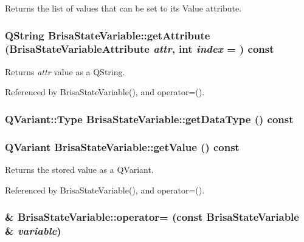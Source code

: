 Returns the list of values that can be set to its Value attribute. \hypertarget{classBrisaUpnp_1_1BrisaStateVariable_ad653413985f270a34de1527638c8ef14}{
\subsubsection[{getAttribute}]{\setlength{\rightskip}{0pt plus 5cm}QString BrisaStateVariable::getAttribute ({\bf BrisaStateVariableAttribute} {\em attr}, \/  int {\em index} = {}) const}}
\label{classBrisaUpnp_1_1BrisaStateVariable_ad653413985f270a34de1527638c8ef14}


Returns {\itshape attr\/} value as a QString. 

Referenced by BrisaStateVariable(), and operator=().\hypertarget{classBrisaUpnp_1_1BrisaStateVariable_ab6b498fd30c4c2906befa82d92dc2846}{
\subsubsection[{getDataType}]{\setlength{\rightskip}{0pt plus 5cm}QVariant::Type BrisaStateVariable::getDataType () const}}
\label{classBrisaUpnp_1_1BrisaStateVariable_ab6b498fd30c4c2906befa82d92dc2846}
\hypertarget{classBrisaUpnp_1_1BrisaStateVariable_a81c90483c7527267cf1c5835a72fbe2d}{
\subsubsection[{getValue}]{\setlength{\rightskip}{0pt plus 5cm}QVariant BrisaStateVariable::getValue () const}}
\label{classBrisaUpnp_1_1BrisaStateVariable_a81c90483c7527267cf1c5835a72fbe2d}


Returns the stored value as a QVariant. 

Referenced by BrisaStateVariable(), and operator=().\hypertarget{classBrisaUpnp_1_1BrisaStateVariable_ac8e1d86af0a88a9ed59e6cd679765317}{
\subsubsection[{operator=}]{ \& BrisaStateVariable::operator= (const {\bf BrisaStateVariable} \& {\em variable})}}
\label{classBrisaUpnp_1_1BrisaStateVariable_ac8e1d86af0a88a9ed59e6cd679765317}


